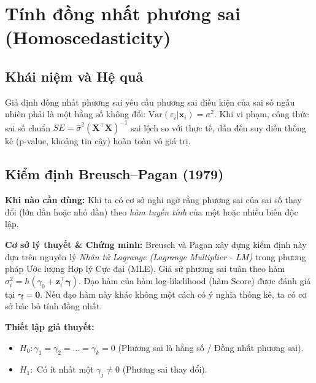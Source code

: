 \documentclass[12pt, a4paper]{article}
\begin{document}
	\section{Tính đồng nhất phương sai (Homoscedasticity)}
	
	\subsection{Khái niệm và Hệ quả}
	Giả định đồng nhất phương sai \cite{dobson2018} yêu cầu phương sai điều kiện của sai số ngẫu nhiên phải là một hằng số không đổi: $\text{Var}(\varepsilon_i | \mathbf{x}_i) = \sigma^2$. Khi vi phạm, công thức sai số chuẩn $SE = \hat{\sigma}^2(\mathbf{X}^\top\mathbf{X})^{-1}$ sai lệch so với thực tế, dẫn đến suy diễn thống kê (p-value, khoảng tin cậy) hoàn toàn vô giá trị.
	
	\subsection{Kiểm định Breusch--Pagan (1979)}
	\textbf{Khi nào cần dùng:} Khi ta có cơ sở nghi ngờ rằng phương sai của sai số thay đổi (lớn dần hoặc nhỏ dần) theo \textit{hàm tuyến tính} của một hoặc nhiều biến độc lập.
	
	\textbf{Cơ sở lý thuyết \& Chứng minh:} Breusch và Pagan \cite{breusch1979} xây dựng kiểm định này dựa trên nguyên lý \textit{Nhân tử Lagrange (Lagrange Multiplier - LM)} trong phương pháp Ước lượng Hợp lý Cực đại (MLE). Giả sử phương sai tuân theo hàm $\sigma_i^2 = h(\gamma_0 + \mathbf{z}_i^{\top}\boldsymbol{\gamma})$. Đạo hàm của hàm log-likelihood (hàm Score) được đánh giá tại $\boldsymbol{\gamma} = \mathbf{0}$. Nếu đạo hàm này khác không một cách có ý nghĩa thống kê, ta có cơ sở bác bỏ tính đồng nhất.
	
	\textbf{Thiết lập giả thuyết:}
	\begin{itemize}
		\item $H_0: \gamma_1 = \gamma_2 = \dots = \gamma_k = 0$ (Phương sai là hằng số / Đồng nhất phương sai).
		\item $H_1:$ Có ít nhất một $\gamma_j \neq 0$ (Phương sai thay đổi).
	\end{itemize}
	
\end{document}

